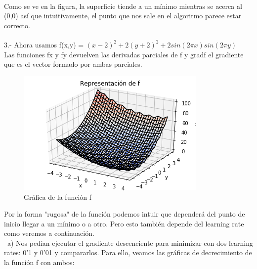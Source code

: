 \documentclass[12pt]{article}
\begin{document}
\\
Como se ve en la figura, la superficie tiende a un mínimo mientras se acerca al (0,0) así que intuitivamente, el punto que nos sale en el algoritmo parece estar correcto. \\\\
3.- Ahora usamos f(x,y) = $(x-2)^{2} + 2(y+2)^{2} + 2sin(2\pi x)sin(2\pi y)$ \\
Las funciones fx y fy devuelven las derivadas parciales de f y gradf el gradiente que es el vector formado por ambas parciales.

\begin{figure}[h]
\centering
\includegraphics[scale=0.75]{Images/GraficaF1.png} 
\caption{Gráfica de la función f}
\label{etiqueta}
\end{figure}
Por la forma "rugosa" de la función podemos intuir que dependerá del punto de inicio llegar a un mínimo o a otro. Pero esto también depende del learning rate como veremos a continuación. \\\
a) Nos pedían ejecutar el gradiente descenciente para minimizar con dos learning rates: 0'1 y 0'01 y compararlos. Para ello, veamos las gráficas de decrecimiento de la función f con ambos: \\
\end{document}
